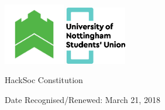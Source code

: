\documentclass[a4paper,twoside,notitlepage,11pt]{article}
\newcommand{\paperTitle}{HackSoc Constitution}
\begin{document}
\begin{center}
\includegraphics[width=0.2\textwidth]{img/hackSocLogo.png}
\includegraphics[width=0.2\textwidth]{img/suLogo.png}
\ \\
	\begin{LARGE}
		\paperTitle \\
	\end{LARGE}
\end{center}
\begin{flushright}
Date Recognised/Renewed: March 21, 2018 \\
\end{flushright}
\end{document}
